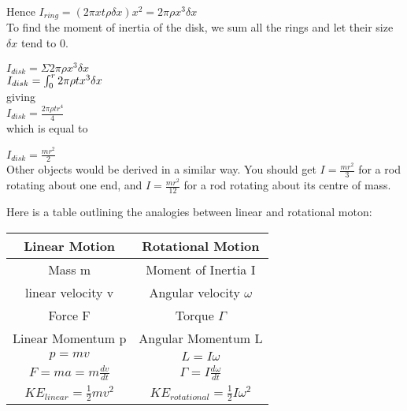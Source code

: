 \documentclass[revision-guide.tex]{subfiles}
\begin{document}
Hence $I_{ring}= (2\pi x t \rho\delta x )x^2 = 2\pi \rho x^{3} \delta x$
\\

To find the moment of inertia of the disk, we sum all the rings and let their size $\delta x$ tend to 0.


$I_{disk}= \Sigma 2\pi \rho x^{3} \delta x$
\\

$I_{disk}= \int\displaylimits_0^r 2\pi \rho  t x^{3}\delta x $
\\

giving
\\

$I_{disk} = \frac{2\pi\rho t r^4}{4}$
\\

which is equal to

$I_{disk} = \frac{mr^2}{2}$
\\

Other objects would be derived in a similar way. You should get $I=\frac{mr^2}{3}$ for a rod rotating about one end, and $I =\frac{mr^2}{12}$ for a rod rotating about its centre of mass.
\\


Here is a table outlining the analogies between linear and rotational moton:
\\

\begin{center}
	\begin{tabular}{||c c||}
		\hline
		\textbf{Linear Motion} & \textbf{Rotational Motion}\\ [0.5ex]
		\hline\hline
		 Mass m &Moment of Inertia I\\
		\hline
		linear velocity v &Angular velocity $\omega$\\
		\hline
		Force F & Torque $\Gamma$ \\
		\hline
		Linear Momentum p  & Angular Momentum L \\
		\hline
		$p=mv$ & $ L = I\omega$  \\
		\hline
		$F=ma =m\frac{dv}{dt}$ & $\Gamma=I \frac{d\omega}{dt}$ \\
		\hline
		$KE_{linear}=\frac{1}{2}mv^2$ & $KE_{rotational} =\frac{1}{2}I\omega ^2$\\ [1ex]
		\hline
	\end{tabular}
\end{center}
\end{document}
